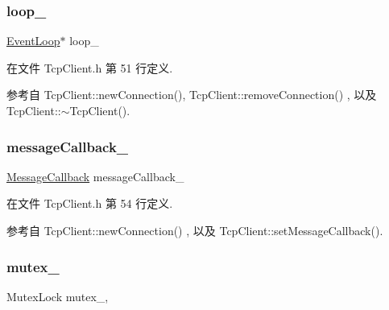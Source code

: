 \subsubsection{\texorpdfstring{loop\+\_\+}{loop\_}}
{\footnotesize\ttfamily \hyperlink{classmuduo_1_1EventLoop}{Event\+Loop}$\ast$ loop\+\_\+\hspace{0.3cm}{\ttfamily [private]}}



在文件 Tcp\+Client.\+h 第 51 行定义.



参考自 Tcp\+Client\+::new\+Connection(), Tcp\+Client\+::remove\+Connection() , 以及 Tcp\+Client\+::$\sim$\+Tcp\+Client().

\mbox{\label{classmuduo_1_1TcpClient_aa4d5ea21d215329779698e634e5e7755}} 
\subsubsection{\texorpdfstring{message\+Callback\+\_\+}{messageCallback\_}}
{\footnotesize\ttfamily \hyperlink{namespacemuduo_ab8a96fa483cffe150618e01058e6fc1b}{Message\+Callback} message\+Callback\+\_\+\hspace{0.3cm}{\ttfamily [private]}}



在文件 Tcp\+Client.\+h 第 54 行定义.



参考自 Tcp\+Client\+::new\+Connection() , 以及 Tcp\+Client\+::set\+Message\+Callback().

\mbox{\label{classmuduo_1_1TcpClient_a6e1bf1809a42f40f1a21178dc6620a6f}} 
\subsubsection{\texorpdfstring{mutex\+\_\+}{mutex\_}}
{\footnotesize\ttfamily Mutex\+Lock mutex\+\_\+\hspace{0.3cm}{\ttfamily [mutable]}, {\ttfamily [private]}}



